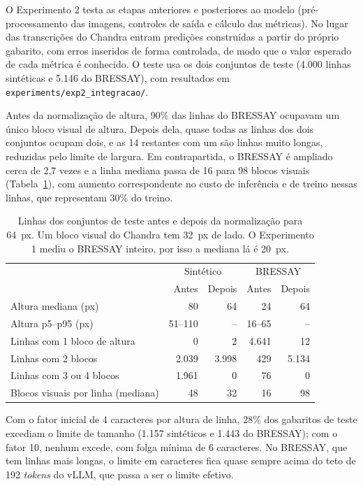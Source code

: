\documentclass[12pt,a4paper]{article}
\begin{document}
O Experimento 2 testa as etapas anteriores e posteriores ao modelo (pré-processamento das imagens, controles de saída e cálculo das métricas). No lugar das transcrições do Chandra entram predições construídas a partir do próprio gabarito, com erros inseridos de forma controlada, de modo que o valor esperado de cada métrica é conhecido. O teste usa os dois conjuntos de teste (4.000 linhas sintéticas e 5.146 do BRESSAY), com resultados em \texttt{experiments/exp2\_integracao/}.

Antes da normalização de altura, 90\% das linhas do BRESSAY ocupavam um único bloco visual de altura. Depois dela, quase todas as linhas dos dois conjuntos ocupam dois, e as 14 restantes com um são linhas muito longas, reduzidas pelo limite de largura. Em contrapartida, o BRESSAY é ampliado cerca de 2,7 vezes e a linha mediana passa de 16 para 98 blocos visuais (Tabela~\ref{tab:norm}), com aumento correspondente no custo de inferência e de treino nessas linhas, que representam 30\% do treino.

\begin{table}[H]
\centering
\small
\begin{tabular}{@{}lrrrr@{}}
\toprule
& \multicolumn{2}{c}{Sintético} & \multicolumn{2}{c}{BRESSAY} \\
& Antes & Depois & Antes & Depois \\
\midrule
Altura mediana (px) & 80 & 64 & 24 & 64 \\
Altura p5--p95 (px) & 51--110 & -- & 16--65 & -- \\
Linhas com 1 bloco de altura & 0 & 2 & 4.641 & 12 \\
Linhas com 2 blocos & 2.039 & 3.998 & 429 & 5.134 \\
Linhas com 3 ou 4 blocos & 1.961 & 0 & 76 & 0 \\
Blocos visuais por linha (mediana) & 48 & 32 & 16 & 98 \\
\bottomrule
\end{tabular}
\caption{Linhas dos conjuntos de teste antes e depois da normalização para 64~px. Um bloco visual do Chandra tem 32~px de lado. O Experimento 1 mediu o BRESSAY inteiro, por isso a mediana lá é 20~px.}
\label{tab:norm}
\end{table}

Com o fator inicial de 4 caracteres por altura de linha, 28\% dos gabaritos de teste excediam o limite de tamanho (1.157 sintéticos e 1.443 do BRESSAY); com o fator 10, nenhum excede, com folga mínima de 6 caracteres. No BRESSAY, que tem linhas mais longas, o limite em caracteres fica quase sempre acima do teto de 192 \emph{tokens} do vLLM, que passa a ser o limite efetivo.
\end{document}
